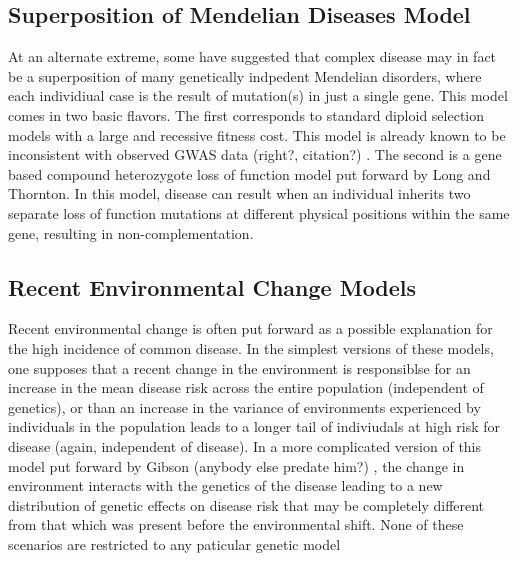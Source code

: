 \documentclass[a4paper,10pt]{article}
\newcommand{\jb}[1]{{\color{blue} (#1)} }
\begin{document}
\subsection{Superposition of Mendelian Diseases Model}
At an alternate extreme, some have suggested that complex disease may in fact be a superposition of many genetically indpedent Mendelian disorders, where each individiual case is the result of mutation(s) in just a single gene. This model comes in two basic flavors. The first corresponds to standard diploid selection models with a large and recessive fitness cost. This model is already known to be inconsistent with observed GWAS data \jb{right?, citation?}. The second is a gene based compound heterozygote loss of function model put forward by Long and Thornton. In this model, disease can result when an individual inherits two separate loss of function mutations at different physical positions within the same gene, resulting in non-complementation.

\subsection{Recent Environmental Change Models}
Recent environmental change is often put forward as a possible explanation for the high incidence of common disease. In the simplest versions of these models, one supposes that a recent change in the environment is responsiblse for an increase in the mean disease risk across the entire population (independent of genetics), or than an increase in the variance of environments experienced by individuals in the population leads to a longer tail of indiviudals at high risk for disease (again, independent of disease). In a more complicated version of this model put forward by Gibson \jb{anybody else predate him?}, the change in environment interacts with the genetics of the disease leading to a new distribution of genetic effects on disease risk that may be completely different from that which was present before the environmental shift. None of these scenarios are restricted to any paticular genetic model

\subsection{}
\end{document}
